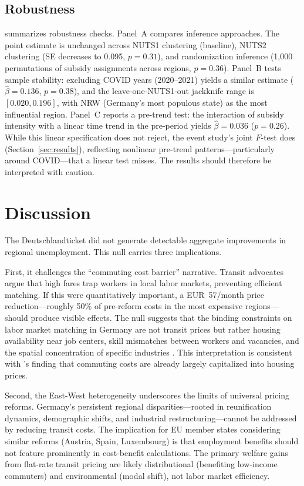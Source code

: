 \documentclass[12pt]{article}
\begin{document}
\subsection{Robustness}

 summarizes robustness checks. Panel~A compares inference approaches. The point estimate is unchanged across NUTS1 clustering (baseline), NUTS2 clustering (SE decreases to 0.095, $p=0.31$), and randomization inference (1,000 permutations of subsidy assignments across regions, $p=0.36$). Panel~B tests sample stability: excluding COVID years (2020--2021) yields a similar estimate ($\hat{\beta}=0.136$, $p=0.38$), and the leave-one-NUTS1-out jackknife range is $[0.020, 0.196]$, with NRW (Germany's most populous state) as the most influential region. Panel~C reports a pre-trend test: the interaction of subsidy intensity with a linear time trend in the pre-period yields $\hat{\beta}=0.036$ ($p=0.26$). While this linear specification does not reject, the event study's joint $F$-test does (Section~\ref{sec:results}), reflecting nonlinear pre-trend patterns---particularly around COVID---that a linear test misses. The results should therefore be interpreted with caution.




\section{Discussion}
\label{sec:discussion}

The Deutschlandticket did not generate detectable aggregate improvements in regional unemployment. This null carries three implications.

First, it challenges the ``commuting cost barrier'' narrative. Transit advocates argue that high fares trap workers in local labor markets, preventing efficient matching. If this were quantitatively important, a EUR~57/month price reduction---roughly 50\% of pre-reform costs in the most expensive regions---should produce visible effects. The null suggests that the binding constraints on labor market matching in Germany are not transit prices but rather housing availability near job centers, skill mismatches between workers and vacancies, and the spatial concentration of specific industries \citep{marinescu2018mismatch, kline2010place}. This interpretation is consistent with \citet{manning2017much}'s finding that commuting costs are already largely capitalized into housing prices.

Second, the East-West heterogeneity underscores the limits of universal pricing reforms. Germany's persistent regional disparities---rooted in reunification dynamics, demographic shifts, and industrial restructuring---cannot be addressed by reducing transit costs. The implication for EU member states considering similar reforms (Austria, Spain, Luxembourg) is that employment benefits should not feature prominently in cost-benefit calculations. The primary welfare gains from flat-rate transit pricing are likely distributional (benefiting low-income commuters) and environmental (modal shift), not labor market efficiency.
\end{document}
